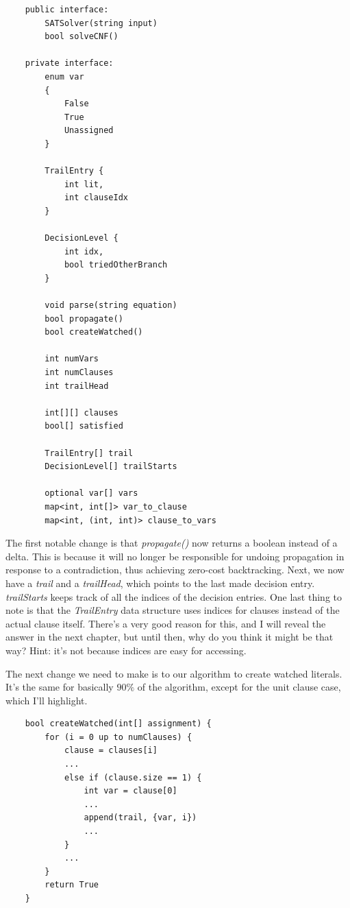 \documentclass[../main.tex]{subfiles}
\begin{document}
\begin{lstlisting}
    public interface:
        SATSolver(string input)
        bool solveCNF()

    private interface:
        enum var
        {
            False
            True
            Unassigned
        }

        TrailEntry {
            int lit,
            int clauseIdx
        }

        DecisionLevel {
            int idx,
            bool triedOtherBranch
        }

        void parse(string equation)
        bool propagate()
        bool createWatched()

        int numVars
        int numClauses
        int trailHead

        int[][] clauses
        bool[] satisfied
        
        TrailEntry[] trail
        DecisionLevel[] trailStarts

        optional var[] vars
        map<int, int[]> var_to_clause
        map<int, (int, int)> clause_to_vars
\end{lstlisting}

The first notable change is that \textit{propagate()} now returns a boolean instead 
of a delta. This is because it will no longer be responsible for undoing propagation 
in response to a contradiction, thus achieving zero-cost backtracking. Next, 
we now have a \textit{trail} and a \textit{trailHead}, which points to the last 
made decision entry. \textit{trailStarts} keeps track of all the indices of the 
decision entries. One last thing to note is that the \textit{TrailEntry} data 
structure uses indices for clauses instead of the actual clause itself. 
There's a very good reason for this, and I will reveal the answer in the next chapter,
but until then, why do you think it might be that way? Hint: it's not because 
indices are easy for accessing. 

The next change we need to make is to our algorithm to create watched literals. 
It's the same for basically $90\%$ of the algorithm, except for the unit clause 
case, which I'll highlight.

\begin{lstlisting}
    bool createWatched(int[] assignment) {
        for (i = 0 up to numClauses) {
            clause = clauses[i]
            ...
            else if (clause.size == 1) {
                int var = clause[0]
                ...
                append(trail, {var, i})
                ...
            }
            ...
        }
        return True
    }
\end{lstlisting}
\end{document}

